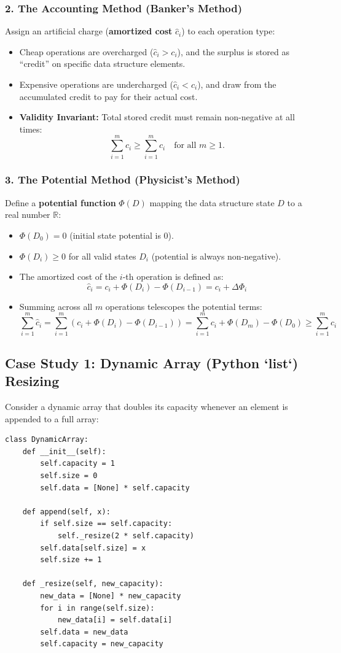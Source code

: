 \documentclass[11pt,a4paper]{article}
\begin{document}
\subsubsection{2. The Accounting Method (Banker's Method)}
Assign an artificial charge (\textbf{amortized cost} $\hat{c}_i$) to each operation type:
\begin{itemize}[itemsep=1pt]
    \item Cheap operations are overcharged ($\hat{c}_i > c_i$), and the surplus is stored as ``credit'' on specific data structure elements.
    \item Expensive operations are undercharged ($\hat{c}_i < c_i$), and draw from the accumulated credit to pay for their actual cost.
    \item \textbf{Validity Invariant:} Total stored credit must remain non-negative at all times:
    \[
    \sum_{i=1}^m \hat{c}_i \ge \sum_{i=1}^m c_i \quad \text{for all } m \ge 1.
    \]
\end{itemize}

\subsubsection{3. The Potential Method (Physicist's Method)}
Define a \textbf{potential function} $\Phi(D)$ mapping the data structure state $D$ to a real number $\mathbb{R}$:
\begin{itemize}[itemsep=1pt]
    \item $\Phi(D_0) = 0$ (initial state potential is 0).
    \item $\Phi(D_i) \ge 0$ for all valid states $D_i$ (potential is always non-negative).
    \item The amortized cost of the $i$-th operation is defined as:
    \[
    \hat{c}_i = c_i + \Phi(D_i) - \Phi(D_{i-1}) = c_i + \Delta\Phi_i
    \]
    \item Summing across all $m$ operations telescopes the potential terms:
    \[
    \sum_{i=1}^m \hat{c}_i = \sum_{i=1}^m \left(c_i + \Phi(D_i) - \Phi(D_{i-1})\right) = \sum_{i=1}^m c_i + \Phi(D_m) - \Phi(D_0) \ge \sum_{i=1}^m c_i
    \]
\end{itemize}

\subsection{Case Study 1: Dynamic Array (Python `list`) Resizing}
Consider a dynamic array that doubles its capacity whenever an element is appended to a full array:
\begin{lstlisting}[style=pythonstyle]
class DynamicArray:
    def __init__(self):
        self.capacity = 1
        self.size = 0
        self.data = [None] * self.capacity

    def append(self, x):
        if self.size == self.capacity:
            self._resize(2 * self.capacity)
        self.data[self.size] = x
        self.size += 1

    def _resize(self, new_capacity):
        new_data = [None] * new_capacity
        for i in range(self.size):
            new_data[i] = self.data[i]
        self.data = new_data
        self.capacity = new_capacity
\end{lstlisting}
\end{document}
